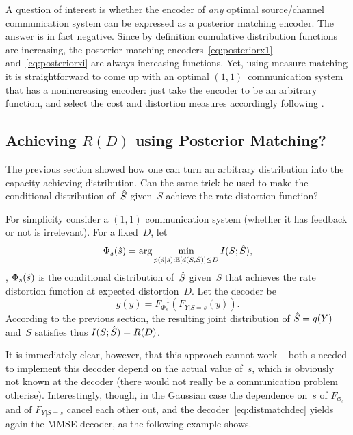 \begin{remark}
  \label{rem:alwaysdistmatch}
  A question of interest is whether the encoder of \emph{any} optimal
  source/channel communication system can be expressed as a posterior matching
  encoder. The answer is in fact negative. Since by definition cumulative
  distribution functions are increasing, the posterior matching
  encoders~\eqref{eq:posteriorx1} and~\eqref{eq:posteriorxi} are always
  increasing functions. Yet, using measure matching it is straightforward to
  come up with an optimal $(1,1)$~communication system that has a nonincreasing
  encoder: just take the encoder to be an arbitrary function, and select the
  cost and distortion measures accordingly following .
\end{remark}


\subsection{Achieving $R(D)$ using Posterior Matching?}

The previous section showed how one can turn an arbitrary distribution into the
capacity achieving distribution. Can the same trick be used to make the
conditional distribution of~${\hat{S}}$ given~$S$ achieve the rate distortion
function? 

For simplicity consider a $(1,1)$ communication system (whether it has feedback
or not is irrelevant). For a fixed~$D$, let
\begin{equation*}
  \Phi_s({\hat{s}}) = \arg\min_{p({\hat{s}}|s): \mathbb{E}[d(S,{\hat{S}})] \le D} I(S;{\hat{S}}),
\end{equation*}
\ie, $\Phi_s({\hat{s}})$ is the conditional distribution of~${\hat{S}}$ given~$S$ that
achieves the rate distortion function at expected distortion~$D$. Let the
decoder be
\begin{equation}
  \label{eq:distmatchdec}
  g(y) = F_{\Phi_s}^{-1}(F_{Y|S=s}(y)).
\end{equation}
According to the previous section, the resulting joint distribution of ${\hat{S}} =
g(Y)$ and~$S$ satisfies thus $I(S;{\hat{S}}) = R(D)$. 

It is immediately clear, however, that this approach cannot work -- both \cdf s
needed to implement this decoder depend on the actual value of~$s$, which is
obviously not known at the decoder (there would not really be a communication
problem otherise). Interestingly, though, in the Gaussian case the dependence
on~$s$ of $F_{\Phi_s}$ and of $F_{Y|S=s}$ cancel each other out, and the
decoder~\eqref{eq:distmatchdec} yields again the MMSE decoder, as the following
example shows.

